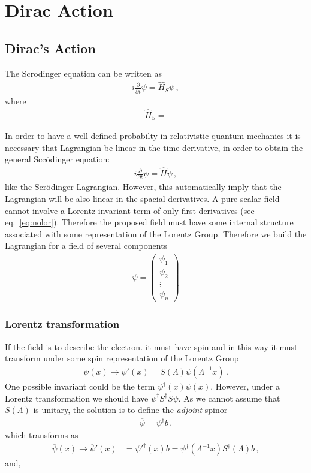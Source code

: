 \appendix

\chapter{Dirac Action}
\label{cha:dirac-action}


\section{Dirac's Action}
\label{sec:dirac-equation}
The Scrodinger equation can be written as
\begin{align}
    i\frac{\partial}{\partial t}\psi=\hat{H}_{S} \psi\,,  
\end{align}
where
\begin{align}
  \hat{H}_{S}=
\end{align}


In order to have a well defined probabilty in relativistic quantum mechanics it is necessary that Lagrangian be linear in the time derivative, in order to obtain the general Sccödinger equation:
\begin{align}
  i\frac{\partial}{\partial t}\psi=\hat{H} \psi\,,  
\end{align}
like the Scrödinger Lagrangian. However, this automatically imply that the Lagrangian will be also linear in the spacial derivatives. A pure scalar field cannot involve a Lorentz invariant term of only first derivatives (see eq.~\eqref{eq:nolor}). Therefore the proposed field must have some internal structure associated with some representation of the Lorentz Group. Therefore we build the Lagrangian for a field of several components
\begin{align}
  \psi=  \begin{pmatrix}
\psi_1\\
\psi_2\\
\vdots\\
\psi_n    
  \end{pmatrix}
\end{align}

\subsection{Lorentz transformation}

If the field is to describe the electron. it must have spin and in this way it must transform under some spin representation of the Lorentz Group
\begin{align}
  \psi(x)\to \psi'(x)=S(\Lambda)\psi\left(\Lambda^{-1}x\right)\,.
\end{align}
One possible invariant could be the term $\psi^\dagger(x)\psi(x)$. However, under a Lorentz transformation we should have $\psi^\dagger S^\dagger S\psi$. As we cannot assume that $S(\Lambda)$ is unitary, the solution is to define the \emph{adjoint} spinor
\begin{align}
  \overline{\psi}=\psi^\dagger b\,.
\end{align}
which transforms as
\begin{align}
  \overline{\psi}(x)\to  \overline{\psi}'(x)&=
{\psi'}^\dagger(x)b=
\psi^\dagger\left(\Lambda^{-1}x\right)S^\dagger(\Lambda)b\,,
\end{align}
and,

